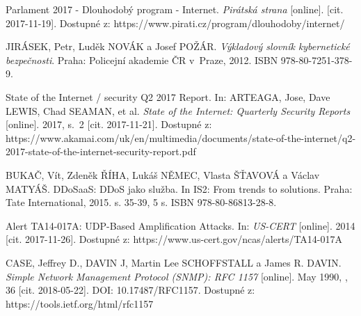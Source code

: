 

\begin{literatura}{99}

Parlament 2017 - Dlouhodobý program - Internet. \textit{Pirátská strana} [online]. [cit. 2017-11-19]. Dostupné z: https://www.pirati.cz/program/dlouhodoby/internet/

JIRÁSEK, Petr, Luděk NOVÁK a Josef POŽÁR. \textit{Výkladový slovník kybernetické bezpečnosti}. Praha: Policejní akademie ČR v~Praze, 2012. ISBN 978-80-7251-378-9.

State of the Internet / security Q2 2017 Report. In: ARTEAGA, Jose, Dave LEWIS, Chad SEAMAN, et al. \textit{State of the Internet: Quarterly Security Reports} [online]. 2017, s.~2 [cit. 2017-11-21]. Dostupné z: https://www.akamai.com/uk/en/multimedia/documents/state-of-the-internet/q2-2017-state-of-the-internet-security-report.pdf

BUKAČ, Vít, Zdeněk ŘÍHA, Lukáš NĚMEC, Vlasta ŠŤAVOVÁ a Václav MATYÁŠ. DDoSaaS: DDoS jako služba. In IS2: From trends to solutions. Praha: Tate International, 2015. s. 35-39, 5 s. ISBN 978-80-86813-28-8.

Alert TA14-017A: UDP-Based Amplification Attacks. In: \textit{US-CERT} [online]. 2014 [cit. 2017-11-26]. Dostupné z: https://www.us-cert.gov/ncas/alerts/TA14-017A

CASE, Jeffrey D., DAVIN J, Martin Lee SCHOFFSTALL a James R. DAVIN. \textit{Simple Network Management Protocol (SNMP): RFC 1157} [online]. May 1990, , 36 [cit. 2018-05-22]. DOI: 10.17487/RFC1157. Dostupné z: https://tools.ietf.org/html/rfc1157

\end{literatura}


%
%
%
